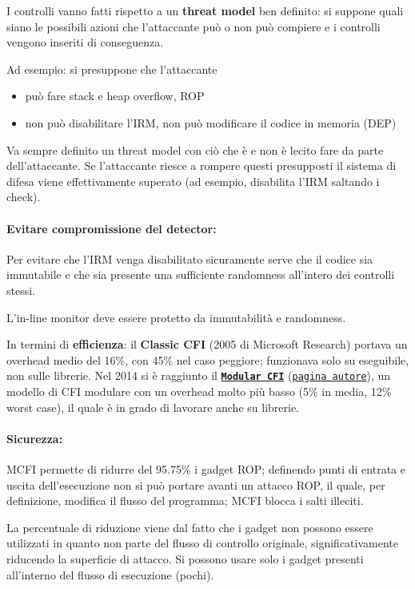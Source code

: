 I controlli vanno fatti rispetto a un \textbf{threat model} ben definito: si suppone quali siano le possibili azioni che l'attaccante può o non può compiere e i controlli vengono inseriti di conseguenza. 

Ad esempio: si presuppone che l'attaccante 
\begin{itemize}
	\item può fare stack e heap overflow, ROP
    
	\item non può disabilitare l'IRM, non può modificare il codice in memoria (DEP)
\end{itemize}

Va sempre definito un threat model con ciò che è e non è lecito fare da parte dell'attaccante. Se l'attaccante riesce a rompere questi presupposti il sistema di difesa viene effettivamente superato (ad esempio, disabilita l'IRM saltando i check).

\paragraph{Evitare compromissione del detector:} Per evitare che l'IRM venga disabilitato sicuramente serve che il codice sia immutabile e che sia presente una sufficiente randomness all'intero dei controlli stessi. 

L'in-line monitor deve essere protetto da immutabilità e randomness.

In termini di \textbf{efficienza}: il \textbf{Classic CFI} (2005 di Microsoft Research) portava un overhead medio del 16\%, con 45\% nel caso peggiore; funzionava solo su eseguibile, non sulle librerie. Nel 2014 si è raggiunto il \href{https://www.cse.psu.edu/~gxt29/papers/mcfi.pdf}{\textbf{\texttt{Modular CFI}}} (\href{https://www.cse.psu.edu/~gxt29/}{\texttt{pagina autore}}), un modello di CFI modulare con un overhead molto più basso (5\% in media, 12\% worst case), il quale è in grado di lavorare anche su librerie.

\paragraph{Sicurezza:} MCFI permette di ridurre del 95.75\% i gadget ROP; definendo punti di entrata e uscita dell'esecuzione non si può portare avanti un attacco ROP, il quale, per definizione, modifica il flusso del programma; MCFI blocca i salti illeciti. 

La percentuale di riduzione viene dal fatto che i gadget non possono essere utilizzati in quanto non parte del flusso di controllo originale, significativamente riducendo la superficie di attacco. Si possono usare solo i gadget presenti all'interno del flusso di esecuzione (pochi).

